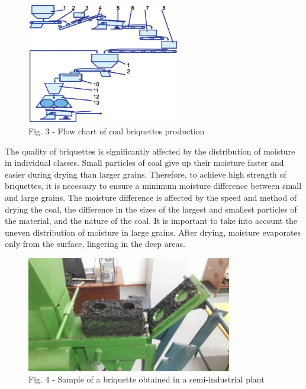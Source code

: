 \begin{figure}[H]
	\centering
	\includegraphics[width=0.6\textwidth]{media/gorn2/image5}
	\caption*{\normalfont\emph{1 - receiving bin, 2 - electrovibration feeder, 3 - lifting
magnet, 4 - belt conveyor, 5 -- screen, 6 - belt conveyor, 7 - roller
crusher, 8 - hammer crusher, 9 - belt conveyor, 10 -- mixer, 11 - hopper
with screw feeder, 12 - roller press, 13 - screen}}
	\caption*{Fig. 3 - Flow chart of coal briquettes production}
\end{figure}

\begin{multicols}{2}
The quality of briquettes is significantly affected by the distribution
of moisture in individual classes. Small particles of coal give up their
moisture faster and easier during drying than larger grains. Therefore,
to achieve high strength of briquettes, it is necessary to ensure a
minimum moisture difference between small and large grains. The moisture
difference is affected by the speed and method of drying the coal, the
difference in the sizes of the largest and smallest particles of the
material, and the nature of the coal. It is important to take into
account the uneven distribution of moisture in large grains. After
drying, moisture evaporates only from the surface, lingering in the deep
areas.
\end{multicols}

\begin{figure}[H]
	\centering
	\includegraphics[width=0.8\textwidth]{media/gorn2/image6}
	\caption*{Fig. 4 - Sample of a briquette obtained in a semi-industrial plant}
\end{figure}

